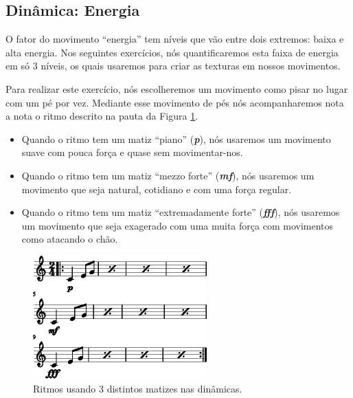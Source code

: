\subsection{Dinâmica: Energia }
\label{sec:musicalidadenergia}
O fator do movimento ``energia'' 
tem níveis que vão entre dois extremos: baixa e alta energia.
Nos seguintes exercícios, nós quantificaremos esta faixa de energia em só 3 níveis, 
os quais usaremos para criar as texturas em nossos movimentos.


\begin{example}
Para realizar este exercício, nós escolheremos um movimento como
pisar no lugar com um pé por vez.  
Mediante esse movimento de pés nós acompanharemos nota a nota 
o ritmo descrito na pauta da Figura \ref{fig:dinamica-energia-ex1}.
\begin{itemize}
\item Quando o ritmo tem um matiz ``piano'' (\textbf{\textit{p}}), 
nós usaremos um movimento suave 
com pouca força e quase sem movimentar-nos.
\item Quando o ritmo tem um matiz ``mezzo forte'' (\textbf{\textit{mf}}), 
nós usaremos um movimento que seja natural, cotidiano e
com uma força regular.
\item Quando o ritmo tem um matiz ``extremadamente forte''  (\textbf{\textit{fff}}), 
nós usaremos um movimento que seja exagerado 
com uma muita força com movimentos como atacando o chão.
\end{itemize}
\end{example}

\begin{figure}[!h]
  \centering
    \includegraphics[width=0.60\textwidth]{chapters/cap-musicalidade/dinamica-energia-1.eps}
\caption{Ritmos usando 3 distintos matizes nas dinâmicas.}
\label{fig:dinamica-energia-ex1}
\end{figure}

